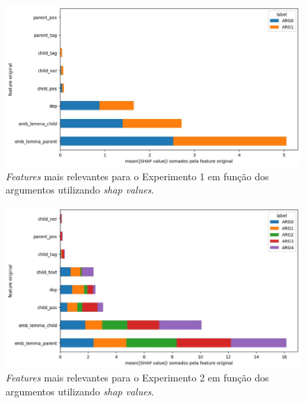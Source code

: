 \begin{figure}[htpb]
  \centering
  \begin{minipage}{.75\textwidth}
  \includegraphics[width=\textwidth]{figure08.jpg}
  \caption{\emph{Features} mais relevantes para o Experimento 1 em função dos argumentos utilizando \emph{shap values}.}
  \label{fig-08}
  \end{minipage}
\end{figure}

\begin{figure}[htbp]
  \centering
  \begin{minipage}{.75\textwidth}
  \includegraphics[width=\textwidth]{figure09.jpg}
  \caption{\emph{Features} mais relevantes para o Experimento 2 em função dos argumentos utilizando \emph{shap values}.}
  \label{fig-09}
  \end{minipage}
\end{figure}


